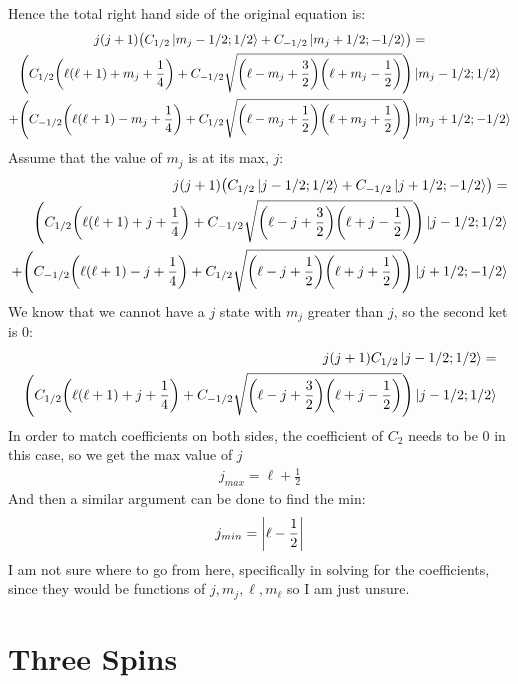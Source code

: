 \documentclass[12pt]{article}
\renewcommand{\l}{\ell}
\begin{document}
Hence the total right hand side of the original equation is:
\begin{gather*}
  j(j+1)\qty(C_{1/2}\ket{m_j-1/2;1/2}+C_{-1/2}\ket{m_j+1/2;-1/2})=
  \\\qty(C_{1/2}\qty(\l(\l+1)+m_j+\frac14)
  +C_{-1/2}\sqrt{\qty(\l-m_j+\frac32)\qty(\l+m_j-\frac12)})\ket{m_j-1/2;1/2}\\
  +\qty(C_{-1/2}\qty(\l(\l+1)-m_j+\frac14)
  +C_{1/2}\sqrt{\qty(\l-m_j+\frac12)\qty(\l+m_j+\frac12)})\ket{m_j+1/2;-1/2}
\end{gather*}
Assume that the value of $m_j$ is at its max, $j$:
\begin{align*}
  j(j+1)\qty(C_{1/2}\ket{j-1/2;1/2}+C_{-1/2}\ket{j+1/2;-1/2})=
  \\\qty(C_{1/2}\qty(\l(\l+1)+j+\frac14)
  +C_{-1/2}\sqrt{\qty(\l-j+\frac32)\qty(\l+j-\frac12)})\ket{j-1/2;1/2}\\
  +\qty(C_{-1/2}\qty(\l(\l+1)-j+\frac14)
  +C_{1/2}\sqrt{\qty(\l-j+\frac12)\qty(\l+j+\frac12)})\ket{j+1/2;-1/2}
\end{align*}
We know that we cannot have a $j$ state with $m_j$ greater than $j$, so the second ket is $0$:
\begin{align*}
  j(j+1)C_{1/2}\ket{j-1/2;1/2}=
  \\\qty(C_{1/2}\qty(\l(\l+1)+j+\frac14)
  +C_{-1/2}\sqrt{\qty(\l-j+\frac32)\qty(\l+j-\frac12)})\ket{j-1/2;1/2}  
\end{align*}
In order to match coefficients on both sides, the coefficient of $C_2$ needs to be $0$ in this case, so we get the max value of $j$
\begin{align*}
  j_{max}=\l+\frac12
\end{align*}
And then a similar argument can be done to find the min:
\begin{align*}
  j_{min}=\abs{\l-\frac12}
\end{align*}
I am not sure where to go from here, specifically in solving for the coefficients, since they would be functions of $j,m_j,\l,m_\l$ so I am just unsure.

\section{Three Spins}
\end{document}
